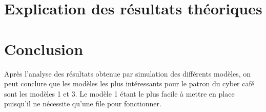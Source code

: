 \documentclass[a4paper,11pt]{article}
\begin{document}
\section{Explication des résultats théoriques}
	
\section{Conclusion}
	Après l'analyse des résultats obtenue par simulation des différents modèles, on peut conclure que les modèles les plus intéressants pour le patron du cyber café sont les modèles 1 et 3. Le modèle 1 étant le plus facile à mettre en place puisqu'il ne nécessite qu'une file pour fonctionner.
\end{document}
